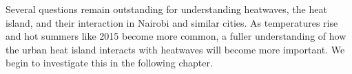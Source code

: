 Several questions remain outstanding for understanding heatwaves, the heat island, and their interaction in Nairobi and similar cities. 
As temperatures rise and hot summers like 2015 become more common, a fuller understanding of how the urban heat island interacts with heatwaves will become more important. We begin to investigate this in the following chapter.

